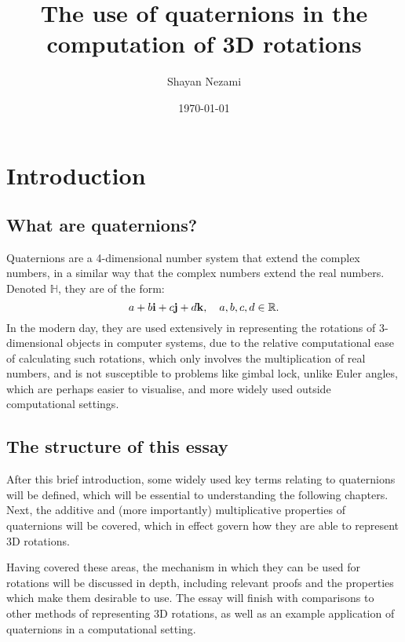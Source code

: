 \documentclass[12pt]{article}
\title{The use of quaternions in the computation of 3D rotations}
\author{Shayan Nezami}
\date{\today}
\theoremstyle{definition}
\begin{document}
\maketitle	
\pagebreak

\tableofcontents
\pagebreak

\section{Introduction}

\subsection{What are quaternions?}

Quaternions are a 4-dimensional number system that extend the complex numbers, in a similar way that the complex numbers extend the real numbers. Denoted $\mathbb{H}$, they are of the form:
\begin{equation}
    a + b\vb{i} + c\vb{j} + d\vb{k}, \quad a, b, c, d \in \mathbb{R}.
\end{equation}
In the modern day, they are used extensively in representing the rotations of 3-dimensional objects in computer systems, due to the relative computational ease of calculating such rotations, which only involves the multiplication of real numbers, and is not susceptible to problems like gimbal lock, unlike Euler angles, which are perhaps easier to visualise, and more widely used outside computational settings. \cite{QuaternionWiki}

\subsection{The structure of this essay}

After this brief introduction, some widely used key terms relating to quaternions will be defined, which will be essential to understanding the following chapters. Next, the additive and (more importantly) multiplicative properties of quaternions will be covered, which in effect govern how they are able to represent 3D rotations.

Having covered these areas, the mechanism in which they can be used for rotations will be discussed in depth, including relevant proofs and the properties which make them desirable to use. The essay will finish with comparisons to other methods of representing 3D rotations, as well as an example application of quaternions in a computational setting.
\end{document}
